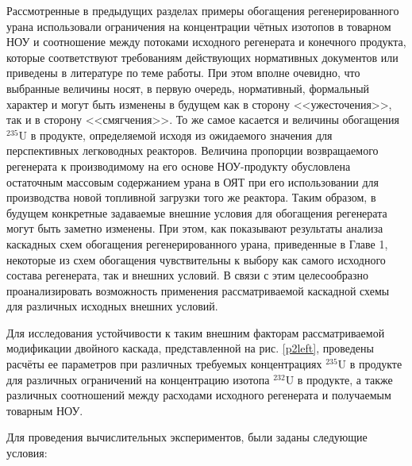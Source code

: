 Рассмотренные в предыдущих разделах примеры обогащения регенерированного урана использовали ограничения на концентрации чётных изотопов в товарном НОУ и соотношение между потоками исходного регенерата и конечного продукта, которые соответствуют требованиям действующих нормативных документов или приведены в литературе по теме работы. При этом вполне очевидно, что выбранные величины носят, в первую очередь, нормативный, формальный характер и могут быть изменены в будущем как в сторону <<ужесточения>>, так и в сторону <<смягчения>>. То же самое касается и величины обогащения $^{235}$U в продукте, определяемой исходя из ожидаемого значения для перспективных легководных реакторов. Величина пропорции возвращаемого регенерата к производимому на его основе НОУ-продукту обусловлена остаточным массовым содержанием урана в ОЯТ при его использовании для производства новой топливной загрузки того же реактора. Таким образом, в будущем конкретные задаваемые внешние условия для обогащения регенерата могут быть заметно изменены. При этом, как показывают результаты анализа каскадных схем обогащения регенерированного урана, приведенные в Главе 1, некоторые из схем обогащения чувствительны к выбору как самого исходного состава регенерата, так и внешних условий. В связи с этим целесообразно проанализировать возможность применения рассматриваемой каскадной схемы для различных исходных внешних условий.

Для исследования устойчивости к таким внешним факторам рассматриваемой модификации двойного каскада, представленной на рис. \ref{p2left}, проведены расчёты ее параметров при различных требуемых концентрациях $^{235}$U в продукте для различных ограничений на концентрацию изотопа $^{232}$U в продукте, а также различных соотношений между расходами исходного регенерата и получаемым товарным НОУ.

Для проведения вычислительных экспериментов, были заданы следующие условия:

